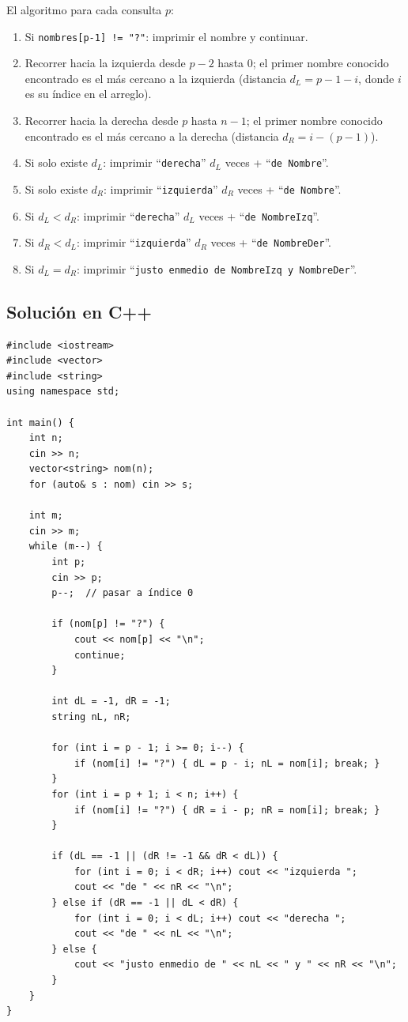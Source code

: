 \documentclass[12pt, oneside]{article}
\begin{document}
El algoritmo para cada consulta $p$:

\begin{enumerate}
  \item Si \texttt{nombres[p-1] != "?"}: imprimir el nombre y continuar.
  \item Recorrer hacia la izquierda desde $p-2$ hasta 0; el primer
        nombre conocido encontrado es el más cercano a la izquierda
        (distancia $d_L = p - 1 - i$, donde $i$ es su índice en el arreglo).
  \item Recorrer hacia la derecha desde $p$ hasta $n-1$; el primer
        nombre conocido encontrado es el más cercano a la derecha
        (distancia $d_R = i - (p-1)$).
  \item Si solo existe $d_L$: imprimir ``\texttt{derecha}'' $d_L$ veces
        + ``\texttt{de Nombre}''.
  \item Si solo existe $d_R$: imprimir ``\texttt{izquierda}'' $d_R$ veces
        + ``\texttt{de Nombre}''.
  \item Si $d_L < d_R$: imprimir ``\texttt{derecha}'' $d_L$ veces +
        ``\texttt{de NombreIzq}''.
  \item Si $d_R < d_L$: imprimir ``\texttt{izquierda}'' $d_R$ veces +
        ``\texttt{de NombreDer}''.
  \item Si $d_L = d_R$: imprimir ``\texttt{justo enmedio de NombreIzq
        y NombreDer}''.
\end{enumerate}

\subsection{Solución en C++}

\begin{verbatim}
#include <iostream>
#include <vector>
#include <string>
using namespace std;

int main() {
    int n;
    cin >> n;
    vector<string> nom(n);
    for (auto& s : nom) cin >> s;

    int m;
    cin >> m;
    while (m--) {
        int p;
        cin >> p;
        p--;  // pasar a índice 0

        if (nom[p] != "?") {
            cout << nom[p] << "\n";
            continue;
        }

        int dL = -1, dR = -1;
        string nL, nR;

        for (int i = p - 1; i >= 0; i--) {
            if (nom[i] != "?") { dL = p - i; nL = nom[i]; break; }
        }
        for (int i = p + 1; i < n; i++) {
            if (nom[i] != "?") { dR = i - p; nR = nom[i]; break; }
        }

        if (dL == -1 || (dR != -1 && dR < dL)) {
            for (int i = 0; i < dR; i++) cout << "izquierda ";
            cout << "de " << nR << "\n";
        } else if (dR == -1 || dL < dR) {
            for (int i = 0; i < dL; i++) cout << "derecha ";
            cout << "de " << nL << "\n";
        } else {
            cout << "justo enmedio de " << nL << " y " << nR << "\n";
        }
    }
}
\end{verbatim}
\end{document}
